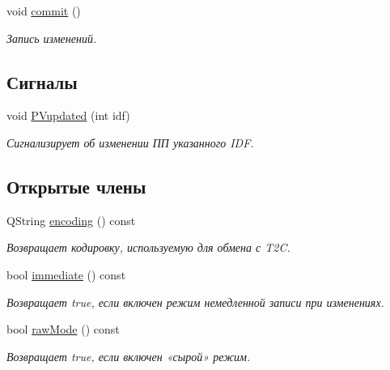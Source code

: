 \begin{DoxyCompactItemize}
\item 
void \hyperlink{class_t2_c_manager_af60d1c7c4da4e192d91c0fd2c86b852d}{commit} ()
\begin{DoxyCompactList}\small\item\em Запись изменений. \end{DoxyCompactList}\end{DoxyCompactItemize}
\subsection*{Сигналы}
\begin{DoxyCompactItemize}
\item 
\hypertarget{class_t2_c_manager_a011afb3a91c2dc08f052f65204dcf24d}{void \hyperlink{class_t2_c_manager_a011afb3a91c2dc08f052f65204dcf24d}{P\-Vupdated} (int idf)}\label{class_t2_c_manager_a011afb3a91c2dc08f052f65204dcf24d}

\begin{DoxyCompactList}\small\item\em Сигнализирует об изменении ПП указанного I\-D\-F. \end{DoxyCompactList}\end{DoxyCompactItemize}
\subsection*{Открытые члены}
\begin{DoxyCompactItemize}
\item 
\hypertarget{class_t2_c_manager_a5905cc8bc0534c5996b6d8b8d655f2db}{Q\-String \hyperlink{class_t2_c_manager_a5905cc8bc0534c5996b6d8b8d655f2db}{encoding} () const }\label{class_t2_c_manager_a5905cc8bc0534c5996b6d8b8d655f2db}

\begin{DoxyCompactList}\small\item\em Возвращает кодировку, используемую для обмена с T2\-C. \end{DoxyCompactList}\item 
\hypertarget{class_t2_c_manager_aa9af65c6157ef33db9afd964b5f3b058}{bool \hyperlink{class_t2_c_manager_aa9af65c6157ef33db9afd964b5f3b058}{immediate} () const }\label{class_t2_c_manager_aa9af65c6157ef33db9afd964b5f3b058}

\begin{DoxyCompactList}\small\item\em Возвращает true, если включен режим немедленной записи при изменениях. \end{DoxyCompactList}\item 
\hypertarget{class_t2_c_manager_ae60fa44cc5737d22d8e3aa2c8d012c43}{bool \hyperlink{class_t2_c_manager_ae60fa44cc5737d22d8e3aa2c8d012c43}{raw\-Mode} () const }\label{class_t2_c_manager_ae60fa44cc5737d22d8e3aa2c8d012c43}

\begin{DoxyCompactList}\small\item\em Возвращает true, если включен «сырой» режим. \end{DoxyCompactList}\end{DoxyCompactItemize}
